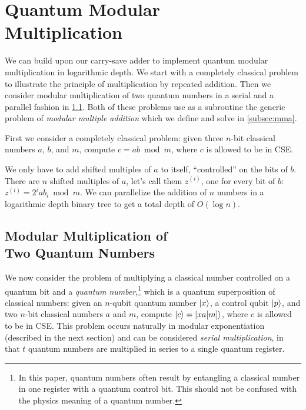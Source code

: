 \section{Quantum Modular\\ Multiplication}
\label{sec:csa-mod-mult}

We can build upon our carry-save adder to implement quantum modular
multiplication in logarithmic depth. We start with a completely classical
problem to illustrate the principle of multiplication by repeated addition.
Then we consider modular multiplication of two quantum numbers in a serial
and a parallel fashion in
\ref{subsec:csa-mod-mult-qq}. Both of these problems use as a subroutine the
generic problem of \emph{modular multiple addition} which we define and solve
in \ref{subsec:mma}.

First we consider a completely classical problem:
given three $n$-bit classical numbers $a$, $b$, and $m$,
compute $c = ab \bmod m$, where $c$ is allowed to be in CSE.

We only have to add shifted
multiples of $a$ to itself, ``controlled'' on the bits of $b$. There are
$n$ shifted multiples of $a$, let's call them $z^{(i)}$, one for every bit of $b$:
$z^{(i)} = 2^i a b_i \bmod m$.
We can parallelize the addition of $n$ numbers in a logarithmic depth
binary tree to get a total depth of $O(\log n)$.

\subsection{Modular Multiplication of\\ Two Quantum Numbers}
\label{subsec:csa-mod-mult-qq}

We now consider the problem of multiplying a classical number controlled
on a quantum bit and a
\emph{quantum number},\footnote{In this paper, quantum
numbers often result by entangling a classical number in one register with a
quantum control bit. This should not be confused with the physics meaning
of a quantum number.} which is a
quantum superposition of classical numbers:
given an $n$-qubit quantum number $\left\vert{x}\right\rangle$, a control qubit $\left\vert{p}\right\rangle$,
and two $n$-bit classical numbers $a$
and $m$,
compute $\left\vert{c}\right\rangle = \left\vert{xa[m]}\right\rangle$, where $c$ is allowed to be in CSE.
This problem occurs naturally in modular exponentiation (described in
the next section) and can be considered \emph{serial multiplication},
in that $t$ quantum numbers are multiplied in series to a single
quantum register.


